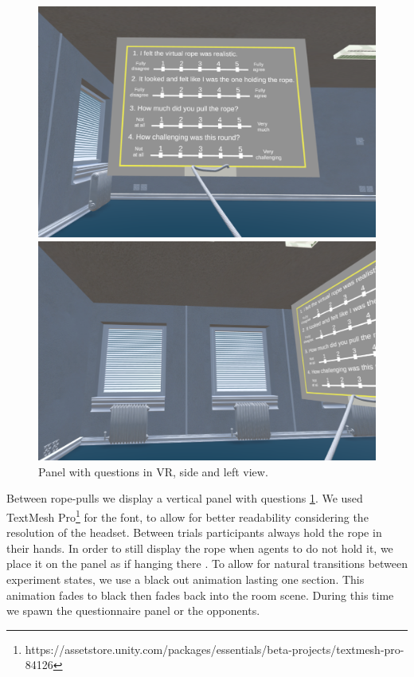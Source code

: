 \begin{figure}
  \centering
  \captionsetup{justification=centering,margin=0.1cm}
\hspace*{\fill}
  \begin{minipage}[b]{0.4\textwidth}
    \includegraphics[width=\textwidth]{Images/quizzPanel.png}
    \end{minipage}
  \hfill
  \begin{minipage}[b]{0.4\textwidth}
    \includegraphics[width=\textwidth]{Images/quizzPanelSide.png}
      \end{minipage}
\hspace*{\fill}
  \caption{Panel with questions in VR, side and left view.}
     \label{fig:VRPanel}
\end{figure}
Between rope-pulls we display a vertical panel with questions \ref{fig:VRPanel}. We used TextMesh Pro\footnote{https://assetstore.unity.com/packages/essentials/beta-projects/textmesh-pro-84126} for the font, to allow for better readability considering the resolution of the headset. Between trials participants always hold the rope in their hands. In order to still display the rope when agents to do not hold it, we place it on the panel as if hanging there . To allow for natural transitions between experiment states, we use a black out animation lasting one section. This animation fades to black then fades back into the room scene. During this time we spawn the questionnaire panel or the opponents. 

